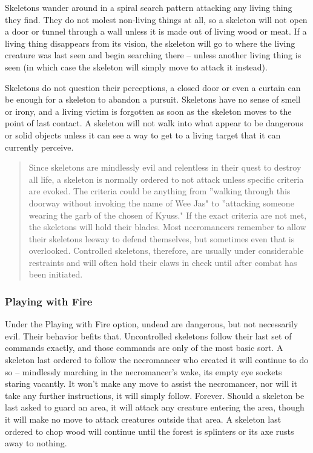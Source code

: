 Skeletons wander around in a spiral search pattern attacking any living thing they find. They do not molest non-living things at all, so a skeleton will not open a door or tunnel through a wall unless it is made out of living wood or meat. If a living thing disappears from its vision, the skeleton will go to where the living creature was last seen and begin searching there -- unless another living thing is seen (in which case the skeleton will simply move to attack it instead).

Skeletons do not question their perceptions, a closed door or even a curtain can be enough for a skeleton to abandon a pursuit. Skeletons have no sense of smell or irony, and a living victim is forgotten as soon as the skeleton moves to the point of last contact. A skeleton will not walk into what appear to be dangerous or solid objects unless it can see a way to get to a living target that it can currently perceive.

\begin{quote}

Since skeletons are mindlessly evil and relentless in their quest to destroy all life, a skeleton is normally ordered to not attack unless specific criteria are evoked. The criteria could be anything from ''walking through this doorway without invoking the name of Wee Jas" to ''attacking someone wearing the garb of the chosen of Kyuss." If the exact criteria are not met, the skeletons will hold their blades. Most necromancers remember to allow their skeletons leeway to defend themselves, but sometimes even that is overlooked. Controlled skeletons, therefore, are usually under considerable restraints and will often hold their claws in check until after combat has been initiated.
\end{quote}

\subsubsection{Playing with Fire}

Under the Playing with Fire option, undead are dangerous, but not necessarily evil. Their behavior befits that. Uncontrolled skeletons follow their last set of commands exactly, and those commands are only of the most basic sort. A skeleton last ordered to follow the necromancer who created it will continue to do so -- mindlessly marching in the necromancer's wake, its empty eye sockets staring vacantly. It won't make any move to assist the necromancer, nor will it take any further instructions, it will simply follow. Forever. Should a skeleton be last asked to guard an area, it will attack any creature entering the area, though it will make no move to attack creatures outside that area. A skeleton last ordered to chop wood will continue until the forest is splinters or its axe rusts away to nothing.

